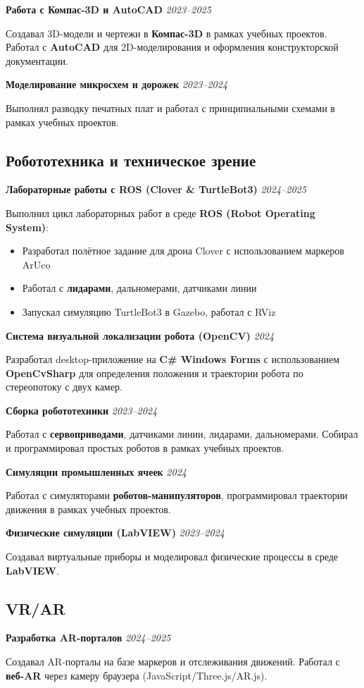 \documentclass[10pt,a4paper]{article}
\newcommand{\projectEntry}[3]{\textbf{#1} \hfill \textit{#2}\par #3\par\vspace{0.3em}}
\begin{document}
\projectEntry{Работа с Компас-3D и AutoCAD}{2023–2025}
{Создавал 3D-модели и чертежи в \textbf{Компас-3D} в рамках учебных проектов. Работал с \textbf{AutoCAD} для 2D-моделирования и оформления конструкторской документации.}

\projectEntry{Моделирование микросхем и дорожек}{2023–2024}
{Выполнял разводку печатных плат и работал с принципиальными схемами в рамках учебных проектов.}

\subsection{Робототехника и техническое зрение}

\projectEntry{Лабораторные работы с ROS (Clover \& TurtleBot3)}{2024–2025}
{Выполнил цикл лабораторных работ в среде \textbf{ROS (Robot Operating System)}:
\begin{itemize}
    \item Разработал полётное задание для дрона Clover с использованием маркеров ArUco
    \item Работал с \textbf{лидарами}, дальномерами, датчиками линии
    \item Запускал симуляцию TurtleBot3 в Gazebo, работал с RViz
\end{itemize}}

\projectEntry{Система визуальной локализации робота (OpenCV)}{2024}
{Разработал desktop-приложение на \textbf{C\# Windows Forms} с использованием \textbf{OpenCvSharp} для определения положения и траектории робота по стереопотоку с двух камер.}

\projectEntry{Сборка робототехники}{2023–2024}
{Работал с \textbf{сервоприводами}, датчиками линии, лидарами, дальномерами. Собирал и программировал простых роботов в рамках учебных проектов.}

\projectEntry{Симуляции промышленных ячеек}{2024}
{Работал с симуляторами \textbf{роботов-манипуляторов}, программировал траектории движения в рамках учебных проектов.}

\projectEntry{Физические симуляции (LabVIEW)}{2023–2024}
{Создавал виртуальные приборы и моделировал физические процессы в среде \textbf{LabVIEW}.}

\subsection{VR/AR}

\projectEntry{Разработка AR-порталов}{2024–2025}
{Создавал AR-порталы на базе маркеров и отслеживания движений. Работал с \textbf{веб-AR} через камеру браузера (JavaScript/Three.js/AR.js).}
\end{document}
